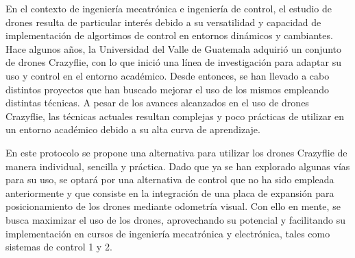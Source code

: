 En el contexto de ingeniería mecatrónica e ingeniería de control, el estudio de drones resulta de particular interés debido a su versatilidad y capacidad de implementación de algortimos de control en entornos dinámicos y cambiantes. Hace algunos años, la Universidad del Valle de Guatemala adquirió un conjunto de drones Crazyflie, con lo que inició una línea de investigación para adaptar su uso y control en el entorno académico. Desde entonces, se han llevado a cabo distintos proyectos que han buscado mejorar el uso de los mismos empleando distintas técnicas. A pesar de los avances alcanzados en el uso de drones Crazyflie, las técnicas actuales resultan complejas y poco prácticas de utilizar en un entorno académico debido a su alta curva de aprendizaje. 

En este protocolo se propone una alternativa para utilizar los drones Crazyflie de manera individual, sencilla y práctica. Dado que ya se han explorado algunas vías para su uso, se optará por una alternativa de control que no ha sido empleada anteriormente y que consiste en la integración de una placa de expansión para posicionamiento de los drones mediante odometría visual. Con ello en mente, se busca maximizar el uso de los drones, aprovechando su potencial y facilitando su implementación en cursos de ingeniería mecatrónica y electrónica, tales como sistemas de control 1 y 2. 